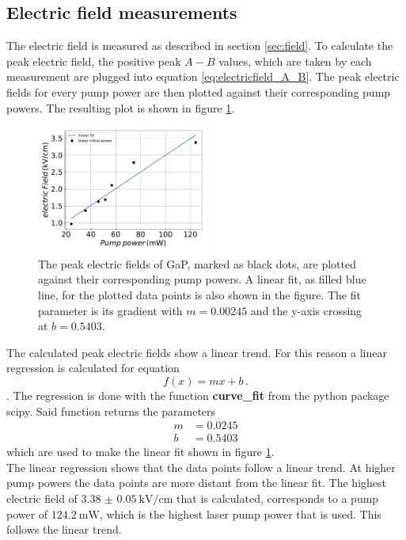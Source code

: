 \subsection{Electric field measurements}
\FloatBarrier
The electric field is measured as described in section \ref{sec:field}.
To calculate the peak electric field, the positive peak $A-B$ values, which are taken by each measurement are plugged into equation \eqref{eq:electricfield_A_B}.
The peak electric fields for every pump power are then plotted against their corresponding pump powers.
The resulting plot is shown in figure \ref{fig:gap_electricfield}.
\begin{figure}
    \centering
    \includegraphics[width=0.5\textwidth]{Plots/eltric_field_GaP.pdf}
    \caption{The peak electric fields of GaP, marked as black dots, are plotted against their corresponding pump powers.
    A linear fit, as filled blue line, for the plotted data points is also shown in the figure.
    The fit parameter is its gradient with $m=0.00245$ and the y-axis crossing at $b=0.5403$.}
    \label{fig:gap_electricfield}
\end{figure}
The calculated peak electric fields show a linear trend.
For this reason a linear regression is calculated for equation  
\begin{equation}
    f(x) = mx+b\,.
\end{equation}.
The regression is done with the function \textbf{curve\_fit} from the python package scipy.
Said function returns the parameters
\begin{align*} 
    m &= 0.0245\\
    b &= 0.5403
\end{align*}
which are used to make the linear fit shown in figure \ref{fig:gap_electricfield}.
\\
The linear regression shows that the data points follow a linear trend.
At higher pump powers the data points are more distant from the linear fit.
The highest electric field of $\SI{3.38(5)}{\kilo\V\per\centi\meter}$ that is calculated, corresponds to a pump power of $\SI{124.2}{\milli\W}$, which is the highest laser pump power that is used.
This follows the linear trend.
\FloatBarrier
